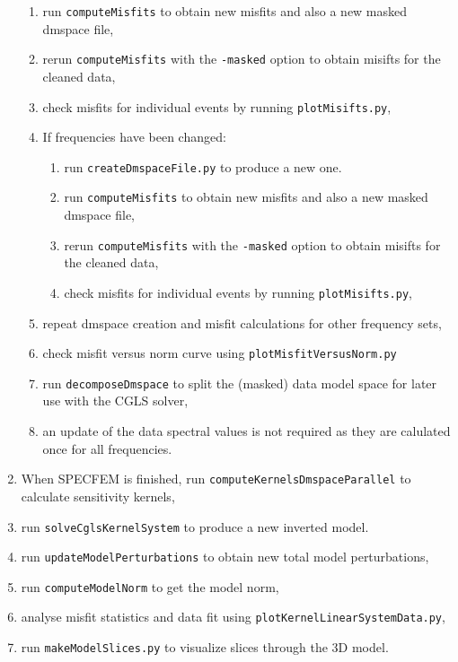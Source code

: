 \begin{enumerate}
\begin{enumerate}
      \item run \verb+computeMisfits+ to obtain new misfits and also a new masked dmspace file,
      \item rerun \verb+computeMisfits+ with the \verb+-masked+ option to obtain misifts for the cleaned data,
      \item check misfits for individual events by running \verb+plotMisifts.py+,
      \item If frequencies have been changed:
      \begin{enumerate}
         \item run \verb+createDmspaceFile.py+ to produce a new one.
         \item run \verb+computeMisfits+ to obtain new misfits and also a new masked dmspace file,
         \item rerun \verb+computeMisfits+ with the \verb+-masked+ option to obtain misifts for the cleaned data,
         \item check misfits for individual events by running \verb+plotMisifts.py+,
      \end{enumerate}
      \item repeat dmspace creation and misfit calculations for other frequency sets,
      \item check misfit versus norm curve using \verb+plotMisfitVersusNorm.py+
      \item run \verb+decomposeDmspace+ to split the (masked) data model space for later use with the CGLS solver,
      \item an update of the data spectral values is not required as they are calulated once for all frequencies.
   \end{enumerate}
   \item When SPECFEM is finished, run \verb+computeKernelsDmspaceParallel+ to calculate sensitivity kernels,
   \item run \verb+solveCglsKernelSystem+ to produce a new inverted model.
   \item run \verb+updateModelPerturbations+ to obtain new total model perturbations,
   \item run \verb+computeModelNorm+ to get the model norm,
   \item analyse misfit statistics and data fit using \verb+plotKernelLinearSystemData.py+,
   \item run \verb+makeModelSlices.py+ to visualize slices through the 3D model.
\end{enumerate}

